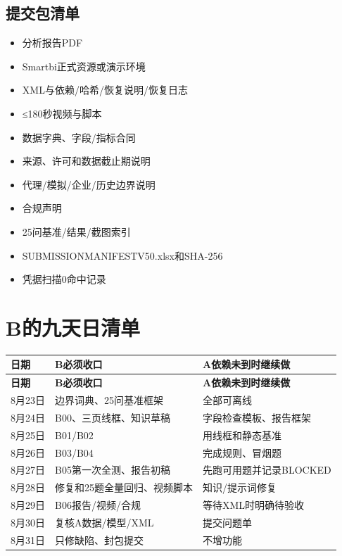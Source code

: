 \documentclass[UTF8,openany,zihao=-4]{ctexbook}
\renewcommand{\_}{\textunderscore\allowbreak}
\begin{document}
\section{提交包清单}
\begin{itemize}[label=$\square$]
\item 分析报告PDF
\item Smartbi正式资源或演示环境
\item XML与依赖/哈希/恢复说明/恢复日志
\item ≤180秒视频与脚本
\item 数据字典、字段/指标合同
\item 来源、许可和数据截止期说明
\item 代理/模拟/企业/历史边界说明
\item 合规声明
\item 25问基准/结果/截图索引
\item SUBMISSION\_MANIFEST\_V50.xlsx和SHA-256
\item 凭据扫描0命中记录
\end{itemize}
\chapter{B的九天日清单}
\begin{longtable}{@{}p{}p{}p{}@{}}
\toprule
\textbf{日期} & \textbf{B必须收口} & \textbf{A依赖未到时继续做} \\
\midrule
\endfirsthead
\toprule
\textbf{日期} & \textbf{B必须收口} & \textbf{A依赖未到时继续做} \\
\midrule
\endhead
8月23日 & 边界词典、25问基准框架 & 全部可离线 \\
8月24日 & B00、三页线框、知识草稿 & 字段检查模板、报告框架 \\
8月25日 & B01/B02 & 用线框和静态基准 \\
8月26日 & B03/B04 & 完成规则、冒烟题 \\
8月27日 & B05第一次全测、报告初稿 & 先跑可用题并记录BLOCKED \\
8月28日 & 修复和25题全量回归、视频脚本 & 知识/提示词修复 \\
8月29日 & B06报告/视频/合规 & 等待XML时明确待验收 \\
8月30日 & 复核A数据/模型/XML & 提交问题单 \\
8月31日 & 只修缺陷、封包提交 & 不增功能 \\
\bottomrule
\end{longtable}
\end{document}
